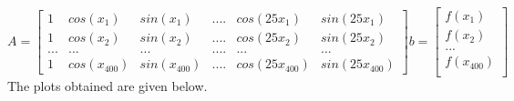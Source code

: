 \documentclass[11pt, a4paper]{article}
\begin{document}
 \begin{equation}
 A = 
 \begin{bmatrix}
 1 & cos(x_1) & sin(x_1) & .... & cos(25x_1) & sin(25x_1)\\
 1 & cos(x_2) & sin(x_2) & .... & cos(25x_2) & sin(25x_2)\\
 ... & ... & ... & .... & ... & ...\\
 1 & cos(x_{400}) & sin(x_{400}) & .... & cos(25x_{400}) & sin(25x_{400})
\end{bmatrix}
b = 
\begin{bmatrix}
 f(x_1)\\
 f(x_2)\\
 ...\\
 f(x_{400})\\
\end{bmatrix}
 \end{equation}
The plots obtained are given below.
\end{document}
